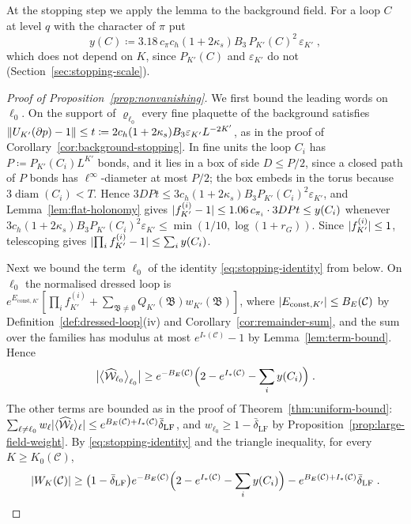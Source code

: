 \documentclass[11pt]{preprint}
\newcommand{\diam}{\operatorname{diam}}
\DeclarePairedDelimiter{\abs}{\lvert}{\rvert}
\DeclarePairedDelimiter{\norm}{\lVert}{\rVert}
\numberwithin{equation}{section}
\theoremstyle{definition}
\theoremstyle{remark}
\theoremstyle{plain}
\begin{document}
At the stopping step we apply the lemma to the background field. For a loop $C$ at level $q$ with the character of $\pi$ put
\begin{equation}\label{eq:flat-loop-constant}
    y(C) \coloneqq 3.18\,c_\pi c_h(1 + 2\kappa_s)B_3\,P_{K'}(C)^2\,\varepsilon_{K'}\;,
\end{equation}
which does not depend on $K$, since $P_{K'}(C)$ and $\varepsilon_{K'}$ do not (Section~\ref{sec:stopping-scale}).

\begin{proof}[Proof of Proposition~\ref{prop:nonvanishing}]
We first bound the leading words on $\ell_0$. On the support of $\varrho_{\ell_0}$ every fine plaquette of the background satisfies $\norm{U_{K'}(\partial p) - 1} \leq t \coloneqq 2c_h(1 + 2\kappa_s)B_3\varepsilon_{K'}L^{-2K'}$, as in the proof of Corollary~\ref{cor:background-stopping}. In fine units the loop $C_i$ has $P \coloneqq P_{K'}(C_i)L^{K'}$ bonds, and it lies in a box of side $D \leq P/2$, since a closed path of $P$ bonds has $\ell^\infty$-diameter at most $P/2$; the box embeds in the torus because $3\diam(C_i) < T$. Hence $3DPt \leq 3c_h(1 + 2\kappa_s)B_3P_{K'}(C_i)^2\varepsilon_{K'}$, and Lemma~\ref{lem:flat-holonomy} gives $\abs{f^{(i)}_{K'} - 1} \leq 1.06\,c_{\pi_i} \cdot 3DPt \leq y(C_i)$ whenever $3c_h(1 + 2\kappa_s)B_3P_{K'}(C_i)^2\varepsilon_{K'} \leq \min(1/10, \log(1 + r_G))$. Since $\abs{f^{(i)}_{K'}} \leq 1$, telescoping gives $\abs{\prod_if^{(i)}_{K'} - 1} \leq \sum_iy(C_i)$.

Next we bound the term $\ell_0$ of the identity \eqref{eq:stopping-identity} from below. On $\ell_0$ the normalised dressed loop is $e^{E_{\mathrm{const},K'}}[\prod_if^{(i)}_{K'} + \sum_{\mathfrak B \neq \emptyset}Q_{K'}(\mathfrak B)w_{K'}(\mathfrak B)]$, where $\abs{E_{\mathrm{const},K'}} \leq B_E(\mathcal C)$ by Definition~\ref{def:dressed-loop}(iv) and Corollary~\ref{cor:remainder-sum}, and the sum over the families has modulus at most $e^{I_*(\mathcal C)} - 1$ by Lemma~\ref{lem:term-bound}. Hence
\begin{equation}\label{eq:trivial-term-from-below}
    \bigl\lvert\bigl\langle\widehat{\mathcal W}_{\ell_0}\bigr\rangle_{\ell_0}\bigr\rvert \geq e^{-B_E(\mathcal C)}\Bigl(2 - e^{I_*(\mathcal C)} - \sum_iy(C_i)\Bigr)\;.
\end{equation}
The other terms are bounded as in the proof of Theorem~\ref{thm:uniform-bound}: $\sum_{\ell \neq \ell_0}w_\ell\abs{\langle\widehat{\mathcal W}_\ell\rangle_\ell} \leq e^{B_E(\mathcal C) + I_*(\mathcal C)}\bar\delta_{\mathrm{LF}}$, and $w_{\ell_0} \geq 1 - \bar\delta_{\mathrm{LF}}$ by Proposition~\ref{prop:large-field-weight}. By \eqref{eq:stopping-identity} and the triangle inequality, for every $K \geq K_0(\mathcal C)$,
\begin{equation}\label{eq:nonvanishing-lower}
    \abs{W_K(\mathcal C)} \geq \bigl(1 - \bar\delta_{\mathrm{LF}}\bigr)e^{-B_E(\mathcal C)}\Bigl(2 - e^{I_*(\mathcal C)} - \sum_iy(C_i)\Bigr) - e^{B_E(\mathcal C) + I_*(\mathcal C)}\bar\delta_{\mathrm{LF}}\;.
\end{equation}


\end{proof}
\end{document}
